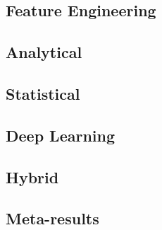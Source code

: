 \subsection{Feature Engineering}
\label{sec:5-feature-engineering}


\subsection{Analytical}

\subsection{Statistical}

\subsection{Deep Learning}

\subsection{Hybrid}

\subsection{Meta-results}
